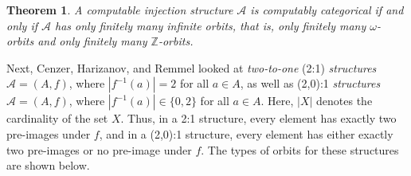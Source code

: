 \documentclass[12pt]{article}
\newtheorem{thm}{Theorem}[section]
\begin{document}
\begin{thm}
A computable injection structure $\mathcal{A}$ is computably categorical if and only if $\mathcal{A}$ has only finitely many infinite orbits, that is, only finitely many $\omega$-orbits and only finitely many $\mathbb{Z}$-orbits.
\end{thm}

Next, Cenzer, Harizanov, and Remmel \cite{Two-to-One} looked at \emph{two-to-one} (2:1) \emph{structures} $\mathcal{A}=(A,f)$, where $|f^{-1}(a)|=2$ for all $a \in A$, as well as (2,0):1 \emph{structures} $\mathcal{A}=(A,f)$, where $|f^{-1}(a)|\in \{0,2\}$ for all $a \in A$. Here, $|X|$ denotes the cardinality of the set $X$. Thus, in a 2:1 structure, every element has exactly two pre-images under $f$, and in a (2,0):1 structure, every element has either exactly two pre-images or no pre-image under $f$. The types of orbits for these structures are shown below.
\end{document}
